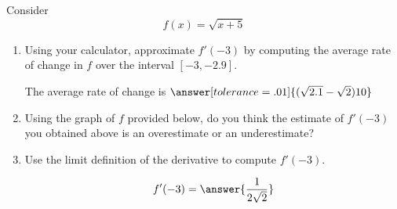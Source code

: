 \documentclass{ximera}
\author{Steven Gubkin}
\begin{document}
\begin{exercise}

Consider 
\[
f(x) = \sqrt{x+5}
\]

\begin{enumerate}
\item Using your calculator, approximate $f'(-3)$ by computing the average rate of change in $f$ over the interval $[-3,-2.9]$. \begin{prompt}   The average rate of change is  $\answer[tolerance=.01]{(\sqrt{2.1}-\sqrt{2})10}$ \end{prompt}
\item Using the graph of $f$ provided below, do you think the estimate of $f'(-3)$ you obtained above is an overestimate or an underestimate?

\begin{prompt}
\begin{multipleChoice}
\end{multipleChoice}
\end{prompt}

\begin{image}
\end{image}

\item Use the limit definition of the derivative to compute $f'(-3)$.  \begin{prompt}$$f'(-3) = \answer{\frac{1}{2\sqrt{2}}}$$\end{prompt}
\end{enumerate}
\end{exercise}
\end{document}
